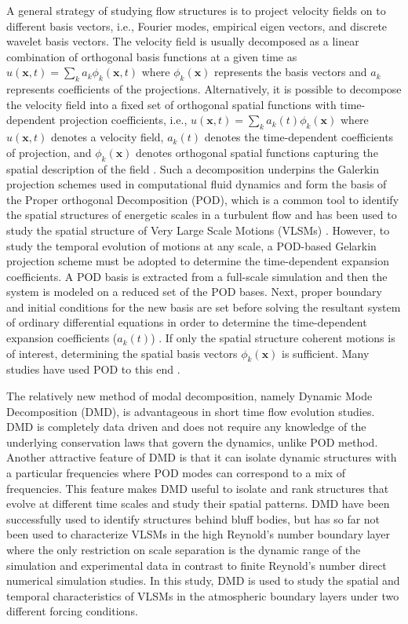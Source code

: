 A general strategy of studying flow structures is to project velocity fields on to different basis vectors, i.e., Fourier modes, empirical eigen vectors, and discrete wavelet basis vectors. The velocity field is usually decomposed as a linear combination of orthogonal basis functions at a given time as $u(\mathbf{x},t) = \sum_k a_k \phi_k(\mathbf{x},t)$ where $\phi_k(\mathbf{x})$ represents the basis vectors and $a_k$ represents coefficients of the projections. Alternatively, it is possible to decompose the velocity field into a fixed set of orthogonal spatial functions with time-dependent projection coefficients,  i.e., $u(\mathbf{x},t)=\sum_k a_k(t) \phi_k(\mathbf{x})$  where $u(\mathbf{x},t)$ denotes a velocity field, $a_k(t)$ denotes the time-dependent  coefficients of projection, and $\phi_k(\mathbf{x})$ denotes orthogonal spatial functions capturing the spatial description of the field \citep{taira_arxiv_2017}. Such a decomposition underpins the Galerkin projection schemes used in computational fluid dynamics \citep{rowley2004model, armbruster_chaos_94} and form the basis of  the Proper orthogonal Decomposition (POD), which is a common tool to identify the spatial structures of energetic scales in a turbulent flow and has been used to study the spatial structure of Very Large Scale Motions (VLSMs) \citep[][]{Hellstrom_pof_2011,bailey_smits_jfm_2010}. However, to study the temporal evolution of motions at any scale, a POD-based Gelarkin projection scheme must be adopted to determine the time-dependent expansion coefficients. A POD basis is extracted from a full-scale simulation and then the system is modeled on a reduced set of the POD bases. Next, proper boundary and initial conditions for the new basis are set before solving the resultant system of ordinary differential equations in order to determine the time-dependent expansion coefficients ($a_k(t)$) \citep[e.g. ][]{stabile2017advances}. If only the spatial structure coherent motions is of interest, determining the spatial basis vectors $\phi_k(\mathbf{x})$ is sufficient. Many studies have used POD to this end \citep[e.g. ][]{li_bouzeid_blm_2011,muld_compFluids_2012}. 

The relatively new method of modal decomposition, namely Dynamic Mode Decomposition (DMD), is advantageous in short time flow evolution studies. DMD is completely data driven and does not require any knowledge of the underlying conservation laws that govern the dynamics, unlike POD method. Another attractive feature of DMD is that it can isolate dynamic structures with a particular frequencies where POD modes can correspond to a mix of frequencies. This feature makes DMD useful to isolate and rank structures that evolve at different time scales and study their spatial patterns. DMD have been successfully used to identify structures behind bluff bodies, but has so far not been used to characterize VLSMs in the high Reynold's number boundary layer where the only restriction on scale separation is the dynamic range of the simulation and experimental data in contrast to finite Reynold's number direct numerical simulation studies.  In this study, DMD is used to study the spatial and temporal characteristics of VLSMs in the atmospheric boundary layers under two different forcing conditions. 

